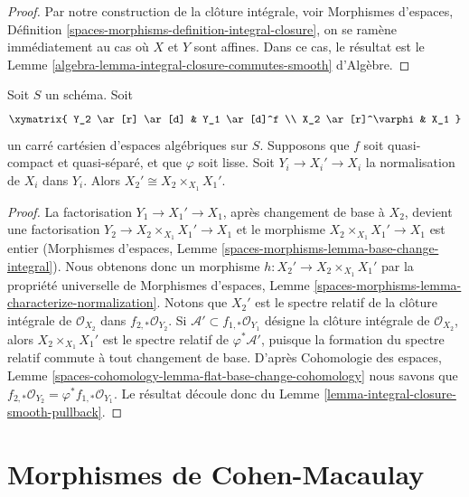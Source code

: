 \begin{proof}
Par notre construction de la clôture intégrale, voir
Morphismes d'espaces, Définition
\ref{spaces-morphisms-definition-integral-closure},
on se ramène immédiatement au cas où $X$ et $Y$ sont affines.
Dans ce cas, le résultat est le
Lemme \ref{algebra-lemma-integral-closure-commutes-smooth} d'Algèbre.
\end{proof}

\begin{lemma}
\label{lemma-normalization-smooth-localization}
Soit $S$ un schéma. Soit
$$
\xymatrix{
Y_2 \ar[r] \ar[d] & Y_1 \ar[d]^f \\
X_2 \ar[r]^\varphi & X_1
}
$$
un carré cartésien d'espaces algébriques sur $S$. Supposons que $f$ soit quasi-compact
et quasi-séparé, et que $\varphi$ soit lisse.
Soit $Y_i \to X_i' \to X_i$ la normalisation de $X_i$ dans $Y_i$.
Alors $X_2' \cong X_2 \times_{X_1} X_1'$.
\end{lemma}

\begin{proof}
La factorisation $Y_1 \to X_1' \to X_1$, après changement de base à $X_2$,
devient une factorisation $Y_2 \to X_2 \times_{X_1} X_1' \to X_1$ et le morphisme
$X_2 \times_{X_1} X_1' \to X_1$ est entier
(Morphismes d'espaces, Lemme \ref{spaces-morphisms-lemma-base-change-integral}).
Nous obtenons donc un morphisme
$h : X_2' \to X_2 \times_{X_1} X_1'$ par la propriété universelle de
Morphismes d'espaces, Lemme
\ref{spaces-morphisms-lemma-characterize-normalization}.
Notons que $X_2'$ est le spectre relatif de la clôture intégrale
de $\mathcal{O}_{X_2}$ dans $f_{2, *}\mathcal{O}_{Y_2}$.
Si $\mathcal{A}' \subset f_{1, *}\mathcal{O}_{Y_1}$ désigne la clôture
intégrale de $\mathcal{O}_{X_2}$, alors $X_2 \times_{X_1} X_1'$ est le
spectre relatif de $\varphi^*\mathcal{A}'$, puisque la formation du
spectre relatif commute à tout changement de base. D'après
Cohomologie des espaces, Lemme
\ref{spaces-cohomology-lemma-flat-base-change-cohomology}
nous savons que $f_{2, *}\mathcal{O}_{Y_2} = \varphi^*f_{1, *}\mathcal{O}_{Y_1}$.
Le résultat découle donc du
Lemme \ref{lemma-integral-closure-smooth-pullback}.
\end{proof}









\section{Morphismes de Cohen-Macaulay}
\label{section-CM}

